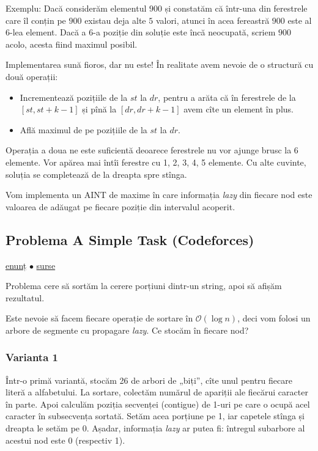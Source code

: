 Exemplu: Dacă considerăm elementul $900$ și constatăm că într-una din ferestrele care îl conțin pe $900$ existau deja alte $5$ valori, atunci în acea fereastră $900$ este al $6$-lea element. Dacă a $6$-a poziție din soluție este încă neocupată, scriem $900$ acolo, acesta fiind maximul posibil.

Implementarea sună fioros, dar nu este! În realitate avem nevoie de o structură cu două operații:

\begin{itemize}
  \item Incrementează pozițiile de la $st$ la $dr$, pentru a arăta că în ferestrele de la $[st, st+k-1]$ și pînă la $[dr, dr + k - 1]$ avem cîte un element în plus.
  \item Află maximul de pe pozițiile de la $st$ la $dr$.
\end{itemize}

Operația a doua ne este suficientă deoarece ferestrele nu vor ajunge brusc la 6 elemente. Vor apărea mai întîi ferestre cu 1, 2, 3, 4, 5 elemente. Cu alte cuvinte, soluția se completează de la dreapta spre stînga.

Vom implementa un AINT de maxime în care informația \textit{lazy} din fiecare nod este valoarea de adăugat pe fiecare poziție din intervalul acoperit.

\subsection{Problema A Simple Task (Codeforces)}
\label{problem:a-simple-task}

\href{https://codeforces.com/problemset/problem/558/E}{enunț}
$\bullet$
\hyperref[code:nezzar-and-binary-string]{surse}

Problema cere să sortăm la cerere porțiuni dintr-un string, apoi să afișăm rezultatul.

Este nevoie să facem fiecare operație de sortare în \(\mathcal{O}(\log n)\), deci vom folosi un arbore de segmente cu propagare \textit{lazy}. Ce stocăm în fiecare nod?

\subsubsection*{Varianta 1}

Într-o primă variantă, stocăm 26 de arbori de „biți”, cîte unul pentru fiecare literă a alfabetului. La sortare, colectăm numărul de apariții ale fiecărui caracter în parte. Apoi calculăm poziția secvenței (contigue) de 1-uri pe care o ocupă acel caracter în subsecvența sortată. Setăm acea porțiune pe 1, iar capetele stînga și dreapta le setăm pe 0. Așadar, informația \textit{lazy} ar putea fi: întregul subarbore al acestui nod este 0 (respectiv 1).

